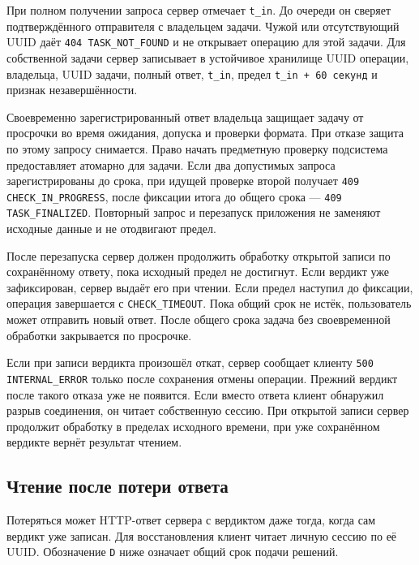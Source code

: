 \documentclass[12pt,a4paper]{article}
\begin{document}
При полном получении запроса сервер отмечает \texttt{t\_in}. До очереди он сверяет подтверждённого отправителя с владельцем задачи. Чужой или отсутствующий UUID даёт \texttt{404 TASK\_\allowbreak{}NOT\_\allowbreak{}FOUND} и не открывает операцию для этой задачи. Для собственной задачи сервер записывает в устойчивое хранилище UUID операции, владельца, UUID задачи, полный ответ, \texttt{t\_in}, предел \texttt{t\_\allowbreak{}in + 60 секунд} и признак незавершённости.

Своевременно зарегистрированный ответ владельца защищает задачу от просрочки во время ожидания, допуска и проверки формата. При отказе защита по этому запросу снимается. Право начать предметную проверку подсистема предоставляет атомарно для задачи. Если два допустимых запроса зарегистрированы до срока, при идущей проверке второй получает \texttt{409 CHECK\_\allowbreak{}IN\_\allowbreak{}PROGRESS}, после фиксации итога до общего срока --- \texttt{409 TASK\_\allowbreak{}FINALIZED}. Повторный запрос и перезапуск приложения не заменяют исходные данные и не отодвигают предел.

После перезапуска сервер должен продолжить обработку открытой записи по сохранённому ответу, пока исходный предел не достигнут. Если вердикт уже зафиксирован, сервер выдаёт его при чтении. Если предел наступил до фиксации, операция завершается с \texttt{CHECK\_\allowbreak{}TIMEOUT}. Пока общий срок не истёк, пользователь может отправить новый ответ. После общего срока задача без своевременной обработки закрывается по просрочке.

Если при записи вердикта произошёл откат, сервер сообщает клиенту \texttt{500 INTERNAL\_\allowbreak{}ERROR} только после сохранения отмены операции. Прежний вердикт после такого отказа уже не появится. Если вместо ответа клиент обнаружил разрыв соединения, он читает собственную сессию. При открытой записи сервер продолжит обработку в пределах исходного времени, при уже сохранённом вердикте вернёт результат чтением.

\subsection{Чтение после потери ответа}\label{ux447ux442ux435ux43dux438ux435-ux43fux43eux441ux43bux435-ux43fux43eux442ux435ux440ux438-ux43eux442ux432ux435ux442ux430}

\hypertarget{чтение-после-потери-ответа}{}

Потеряться может HTTP-ответ сервера с вердиктом даже тогда, когда сам вердикт уже записан. Для восстановления клиент читает личную сессию по её UUID. Обозначение \texttt{D} ниже означает общий срок подачи решений.
\end{document}
